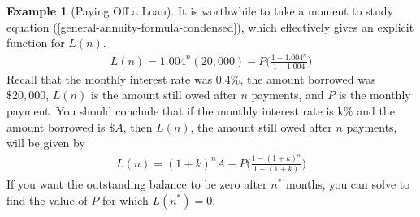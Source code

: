 \documentclass[10pt,]{book}
\theoremstyle{plain}
\theoremstyle{definition}
\theoremstyle{definition}
\newtheorem{example}[theorem]{Example}
\theoremstyle{definition}
\numberwithin{equation}{section}
\begin{document}
\begin{example}[Paying Off a Loan]
It is worthwhile to take a moment to study equation \hyperref[general-annuity-formula-condensed]{(\ref{general-annuity-formula-condensed})}, which effectively gives an explicit function for \(L(n)\).%
%
\begin{gather*}
L(n) = 1.004^n (20,000) - P \bigg(\frac{1-1.004^n}{1-1.004}\bigg)
\end{gather*}
\hypertarget{p-171}{}%
Recall that the monthly interest rate was \(0.4\%\), the amount borrowed was \(\$20,000\),  \(L(n)\) is the amount still owed after \(n\) payments, and \(P\) is the monthly payment. You should conclude that if the monthly interest rate is k\% and the amount borrowed is \(\$A\), then \(L(n)\), the amount still owed after \(n\) payments, will be given by%
%
\begin{gather}
L(n) = (1+k)^n A - P \bigg(\frac{1-(1+k)^n}{1-(1+k)}\bigg)\label{mrow-100}
\end{gather}
\hypertarget{p-172}{}%
If you want the outstanding balance to be zero after \(n^*\) months, you can solve to find the value of \(P\) for which \(L(n^*)=0\).%
\end{example}
\typeout{************************************************}
\typeout{************************************************}
\end{document}
